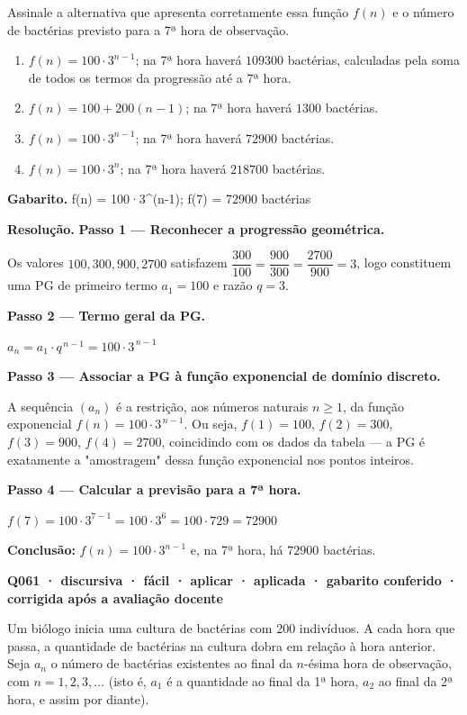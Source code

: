 \documentclass[11pt,a4paper]{article}
\begin{document}
Assinale a alternativa que apresenta corretamente essa função $f(n)$ e o número de bactérias previsto para a 7ª hora de observação.
\begin{enumerate}[label=(\alph*)]
\item $f(n) = 100 \cdot 3^{n-1}$; na 7ª hora haverá $109300$ bactérias, calculadas pela soma de todos os termos da progressão até a 7ª hora.
\item $f(n) = 100 + 200(n-1)$; na 7ª hora haverá $1300$ bactérias.
\item $f(n) = 100 \cdot 3^{n-1}$; na 7ª hora haverá $72900$ bactérias.
\item $f(n) = 100 \cdot 3^{n}$; na 7ª hora haverá $218700$ bactérias.
\end{enumerate}

\textbf{Gabarito.} f(n) = 100·3\textasciicircum{}(n-1); f(7) = 72900 bactérias

\textbf{Resolução.} \textbf{Passo 1 — Reconhecer a progressão geométrica.}

Os valores $100, 300, 900, 2700$ satisfazem $\dfrac{300}{100} = \dfrac{900}{300} = \dfrac{2700}{900} = 3$, logo constituem uma PG de primeiro termo $a_1 = 100$ e razão $q = 3$.

\textbf{Passo 2 — Termo geral da PG.}

$a_n = a_1 \cdot q^{\,n-1} = 100 \cdot 3^{\,n-1}$

\textbf{Passo 3 — Associar a PG à função exponencial de domínio discreto.}

A sequência $(a_n)$ é a restrição, aos números naturais $n \geq 1$, da função exponencial $f(n) = 100 \cdot 3^{\,n-1}$. Ou seja, $f(1)=100$, $f(2)=300$, $f(3)=900$, $f(4)=2700$, coincidindo com os dados da tabela — a PG é exatamente a "amostragem" dessa função exponencial nos pontos inteiros.

\textbf{Passo 4 — Calcular a previsão para a 7ª hora.}

$f(7) = 100 \cdot 3^{7-1} = 100 \cdot 3^{6} = 100 \cdot 729 = 72900$

\textbf{Conclusão:} $f(n) = 100 \cdot 3^{n-1}$ e, na 7ª hora, há $72900$ bactérias.

\bigskip\noindent\textbf{Q061 · discursiva · fácil · aplicar · aplicada · gabarito conferido · corrigida após a avaliação docente}\par\nopagebreak
Um biólogo inicia uma cultura de bactérias com 200 indivíduos. A cada hora que passa, a quantidade de bactérias na cultura dobra em relação à hora anterior. Seja $a_n$ o número de bactérias existentes ao final da $n$-ésima hora de observação, com $n = 1, 2, 3, \dots$ (isto é, $a_1$ é a quantidade ao final da 1ª hora, $a_2$ ao final da 2ª hora, e assim por diante).
\end{document}

